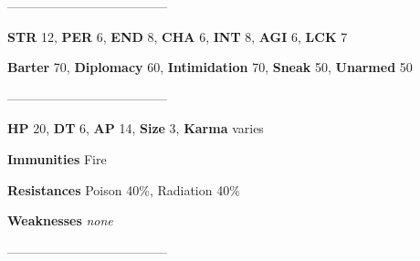 \documentclass[11pt,a4paper,twocolumn]{book}
\begin{document}
%		
%	
%		

	--------------------------------------

	\noindent
	\textbf{STR} 12, \textbf{PER} 6, \textbf{END} 8, \textbf{CHA} 6, \textbf{INT} 8, \textbf{AGI} 6, \textbf{LCK} 7
	
	\noindent
	\textbf{Barter} 70, \textbf{Diplomacy} 60, \textbf{Intimidation} 70, \textbf{Sneak} 50, \textbf{Unarmed} 50
	
	--------------------------------------
	
	\noindent
	\textbf{HP} 20, \textbf{DT} 6, \textbf{AP} 14, \textbf{Size} 3, \textbf{Karma} varies
	
	
	\noindent
	\textbf{Immunities} Fire
	
	\noindent
	\textbf{Resistances} Poison 40\%, Radiation 40\%
	
	\noindent
	\textbf{Weaknesses} \emph{none} %
	
	--------------------------------------
	
\end{document}
